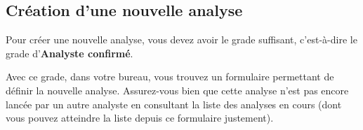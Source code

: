 \subsection{Création d'une nouvelle analyse}\hypertarget{cration-dune-nouvelle-analyse}{}\label{cration-dune-nouvelle-analyse}

Pour créer une nouvelle analyse, vous devez avoir le grade suffisant, c'est-à-dire le grade d'\textbf{Analyste confirmé}.

Avec ce grade, dans votre bureau, vous trouvez un formulaire permettant de définir la nouvelle analyse. Assurez-vous bien que cette analyse n'est pas encore lancée par un autre analyste en consultant la liste des analyses en cours (dont vous pouvez atteindre la liste depuis ce formulaire justement).

